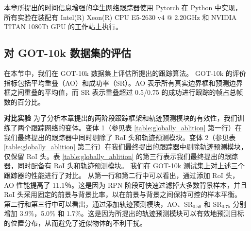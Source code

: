 本章所提出的时间信息增强的孪生网络跟踪器使用 Pytorch 在 Python 中实现，所有实验在装配有 Intel(R) Xeon(R) CPU E5-2630 v4 @ 2.20GHz 和 NVIDIA TITAN 1080Ti GPU 的工作站上执行。

\subsection{对 GOT-10k 数据集的评估}
在本节中，我们在 GOT-10k \cite{GOT-10k} 数据集上评估所提出的跟踪算法。
GOT-10k 的评价指标包括平均重叠（AO）和成功率（SR）。AO 表示所有真实边界框和预测边界框之间重叠的平均值，而 SR 表示重叠超过 0.5/0.75 的成功进行跟踪的帧占总帧数的百分比。

\textbf{对比实验}
为了分析本章提出的两阶段跟踪框架和轨迹预测模块的有效性，我们训练了两个跟踪网络的变体。变体 1（参见表 \ref{table:globally_ablition} 第一行）在我们最终提出的跟踪器中同时剔除了 RoI 头和轨迹预测模块。变体 2（参见表 \ref{table:globally_ablition} 第二行）在我们最终提出的跟踪器中剔除轨迹预测模块，仅保留 RoI 头。表 \ref{table:globally_ablition} 的第三行表示我们最终提出的跟踪器，同时配备有 RoI 头和轨迹预测模块。
我们在 GOT-10k 测试集上对上述三个跟踪器的性能进行了对比。
从第一行和第二行中可以看出，通过添加 RoI 头，AO 性能提高了 11.1％。这是因为 RPN 阶段可快速过滤掉大多数背景样本，并且 RoI 头采用固定的前景与背景比率，以在前景与背景之间保持可控的样本平衡。
第二行和第三行中可以看出，通过添加轨迹预测模块，AO、SR$_{0.50}$ 和 SR$_{0.75}$ 分别增加 3.9\%，5.0\% 和 1.7\%。这是因为所提出的轨迹预测模块可以有效地预测目标的位置分布，从而避免了近似物体的不利干扰。

